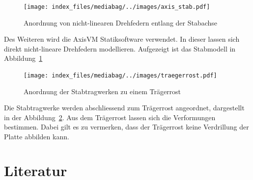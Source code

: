 \documentclass[
  12pt,
  letterpaper,
  egregdoesnotlikesansseriftitles]{scrreprt}
\begin{document}
\begin{figure}[H]

{\centering \texttt{[image: index\_files/mediabag/../images/axis\_stab.pdf]}

}

\caption{\label{fig-axis_stab}Anordnung von nicht-linearen Drehfedern
entlang der Stabachse}

\end{figure}

Des Weiteren wird die AxisVM Statiksoftware verwendet. In dieser lassen
sich direkt nicht-lineare Drehfedern modellieren. Aufgezeigt ist das
Stabmodell in Abbildung~\ref{fig-axis_stab}

\begin{figure}[H]

{\centering \texttt{[image: index\_files/mediabag/../images/traegerrost.pdf]}

}

\caption{\label{fig-traegerrost}Anordnung der Stabtragwerken zu einem
Trägerrost}

\end{figure}

Die Stabtragwerke werden abschliessend zum Trägerrost angeordnet,
dargestellt in der Abbildung~\ref{fig-traegerrost}. Aus dem Trägerrost
lassen sich die Verformungen bestimmen. Dabei gilt es zu vermerken, dass
der Trägerrost keine Verdrillung der Platte abbilden kann.


\hypertarget{literatur}{%
\chapter*{Literatur}\label{literatur}}

\end{document}
